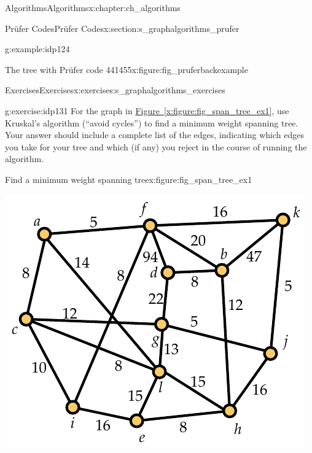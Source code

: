 \documentclass[oneside,10pt,]{book}
\newcommand{\xreffont}{\relax}
\numberwithin{equation}{section}
\begin{document}
\begin{chapterptx}{Algorithms}{}{Algorithms}{}{}{x:chapter:ch_algorithms}
\begin{sectionptx}{Prüfer Codes}{}{Prüfer Codes}{}{}{x:section:s_graphalgorithms_prufer}
\begin{example}{}{g:example:idp124}
\begin{figureptx}{The tree with Prüfer code 441455}{x:figure:fig_pruferbackexample}{}
\begin{image}{0.15}{0.7}{0.15}
{
}%
\end{image}%
\tcblower
\end{figureptx}%
\end{example}
\end{sectionptx}
%
%
\typeout{************************************************}
\typeout{************************************************}
%
\begin{exercises-section}{Exercises}{}{Exercises}{}{}{x:exercises:s_graphalgorithms_exercises}
\begin{divisionexercise}{1}{}{}{g:exercise:idp131}%
For the graph in \hyperref[x:figure:fig_span_tree_ex1]{Figure~{\xreffont\ref{x:figure:fig_span_tree_ex1}}}, use Kruskal's algorithm (``avoid cycles'') to find a minimum weight spanning tree. Your answer should include a complete list of the edges, indicating which edges you take for your tree and which (if any) you reject in the course of running the algorithm.%
\begin{figureptx}{Find a minimum weight spanning tree}{x:figure:fig_span_tree_ex1}{}%
\begin{image}{0.175}{0.65}{0.175}%
\includegraphics[width=\linewidth]{images/span_tree_ex1}
\end{image}%
\tcblower
\end{figureptx}%
\end{divisionexercise}%

\end{exercises-section}
\end{chapterptx}
\end{document}
